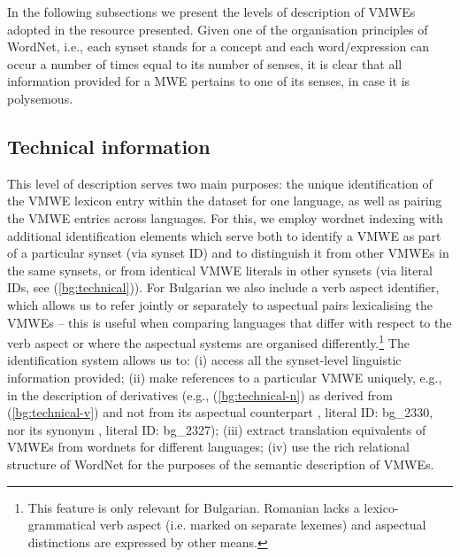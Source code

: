 \documentclass[output=paper,colorlinks,citecolor=brown]{langscibook}
\begin{document}
In the following subsections we present the levels of description of VMWEs adopted in the resource presented. Given one of the organisation principles of WordNet, i.e., each synset stands for a concept and each word/expression can occur a number of times equal to its number of senses, it is clear that all information provided for a MWE pertains to one of its senses, in case it is polysemous. 

\subsection{Technical information}\label{sec:tech}

This level of description serves two main purposes: the unique identification of the VMWE lexicon entry within the dataset for one language, as well as pairing the VMWE entries across languages. 
For this, we employ wordnet indexing with additional identification elements which serve both to identify a VMWE as part of a particular synset (via synset ID) and to distinguish it from other VMWEs in the same synsets, or from identical VMWE literals in other synsets (via literal IDs, see (\ref{bg:technical})). For Bulgarian we also include a verb aspect identifier, which allows us to refer jointly or separately to aspectual pairs lexicalising the VMWEs -- this is useful when comparing languages that differ with respect to the verb aspect %
or where the aspectual systems are organised differently.\footnote{This feature is only relevant for Bulgarian. Romanian lacks a lexico-grammatical verb aspect (i.e. marked on separate lexemes) and aspectual distinctions are expressed by other means.} The identification system allows us to: (i) access all the synset-level linguistic information provided; (ii) make references to a particular VMWE uniquely, e.g., in the description of derivatives (e.g., (\ref{bg:technical-n}) as derived from (\ref{bg:technical-v}) and not from its aspectual counterpart , literal ID: bg\_2330, nor its synonym , literal ID: bg\_2327); (iii) extract translation equivalents of VMWEs from wordnets for different languages; (iv) use the rich relational structure of WordNet for the purposes of the semantic description of VMWEs. 
\end{document}
